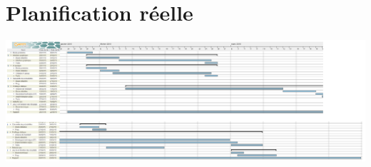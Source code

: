 \documentclass{report}
\begin{document}
\chapter{Planification réelle}
		 \hspace{-2.7cm} 
			\includegraphics[scale=0.24]{../DiagrammeReel.png}

	\medskip
\end{document}

